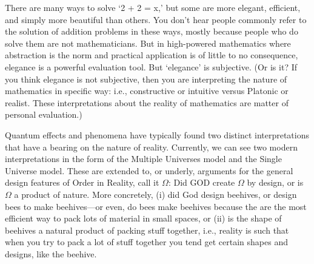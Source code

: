 \documentclass{article}
\begin{document}
\begin{exe}
\ex There are many ways to solve `2 + 2 = x,' but some are more elegant, efficient, and simply more beautiful than others. You don't hear people commonly refer to the solution of addition problems in these ways, mostly because people who do solve them are not mathematicians. But in high-powered mathematics where abstraction is the norm and practical application is of little to no consequence, elegance is a powerful evaluation tool. But `elegance' is subjective. (Or is it? If you think elegance is not subjective, then you are interpreting the nature of mathematics in specific way: i.e., constructive or intuitive versus Platonic or realist. These interpretations about the reality of mathematics are matter of personal evaluation.)

\ex Quantum effects and phenomena have typically found two distinct interpretations that have a bearing on the nature of reality. Currently, we can see two modern interpretations in the form of the Multiple Universes model and the Single Universe model. These are extended to, or underly, arguments for the general design features of Order in Reality, call it $\Omega$: Did GOD create $\Omega$ by design, or is $\Omega$ a product of nature. More concretely, (i) did God design beehives, or design bees to make beehives---or even, do bees make beehives because the are the most efficient way to pack lots of material in small spaces, or (ii) is the shape of beehives a natural product of packing stuff together, i.e., reality is such that when you try to pack a lot of stuff together you tend get certain shapes and designs, like the beehive.
\end{exe}
\end{document}
